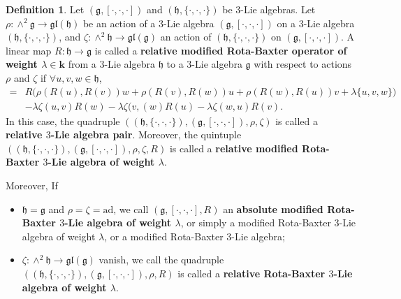 \documentclass[12pt]{amsart}
\theoremstyle{definition}
\newtheorem{defn}[theorem]{Definition}
\newcommand{\bk}{{\mathbf{k}}}
\begin{document}
\begin{defn}Let $\left(\mathfrak{g},[\cdot, \cdot, \cdot]\right)$ and $\left(\mathfrak{h},\{\cdot, \cdot, \cdot\}\right)$ be $3$-Lie algebras.
	Let $\rho: \wedge^2 \mathfrak{g} \rightarrow \mathfrak{g l}(\mathfrak{h})$  be an action of a $3$-Lie algebra $\left(\mathfrak{g},[\cdot, \cdot, \cdot]\right)$ on a $3$-Lie algebra $\left(\mathfrak{h},\{\cdot, \cdot, \cdot\}\right)$,  and $\zeta:\wedge^2\mathfrak{h}\rightarrow \mathfrak{g l}(\mathfrak{g})$ an action of   $\left(\mathfrak{h},\{\cdot, \cdot, \cdot\}\right)$ on  $\left(\mathfrak{g},[\cdot, \cdot, \cdot]\right)$. A linear map $R: \mathfrak{h} \rightarrow \mathfrak{g}$ is called a \textbf{relative modified Rota-Baxter  operator of weight $\lambda \in \bk$} from a $3$-Lie algebra $\mathfrak{h}$ to a $3$-Lie algebra $\mathfrak{g}$ with respect to   actions $\rho$ and $\zeta$ if $ \forall u, v, w \in \mathfrak{h}$,
	\begin{align*}
		[R(u), R(v), R(w)]=&R\Big(\rho(R(u), R(v)) w+\rho(R(v), R (w)) u+\rho(R(w), R(u)) v+\lambda \{u, v, w\}\Big)\\
		&-\lambda \zeta(u,v)R(w)-\lambda \zeta(v,(w)R(u)-\lambda \zeta(w,u)R(v).
	\end{align*}
In this case, the quadruple $\left(  \left(\mathfrak{h},\{\cdot, \cdot, \cdot\}\right),\left(\mathfrak{g},[\cdot, \cdot, \cdot]\right),\rho,\zeta \right) $ is called a \textbf{relative $3$-Lie algebra pair}.
Moreover, the quintuple $\left( \left(\mathfrak{h},\{\cdot, \cdot, \cdot\}\right),\left(\mathfrak{g},[\cdot, \cdot, \cdot]\right),\rho,\zeta,R\right) $ is called a \textbf{relative modified Rota-Baxter $3$-Lie algebra of weight $\lambda$}.
	
	Moreover, If
	\begin{itemize}
		\item  [(a)]  $\mathfrak{h}=\mathfrak{g}$ and $\rho=\zeta=\mathrm{ad}$, we call
		$(\mathfrak{g},[\cdot,\cdot,\cdot],R)$ an \textbf{absolute modified Rota-Baxter $3$-Lie algebra of weight $\lambda$},
		or simply a modified Rota-Baxter $3$-Lie algebra of weight $\lambda$,
		or a modified Rota-Baxter $3$-Lie algebra;
		\item [(b)] $\zeta:\wedge^2\mathfrak{h}\rightarrow \mathfrak{g l}(\mathfrak{g})$ vanish, we call the quadruple $\left( \left(\mathfrak{h},\{\cdot, \cdot, \cdot\}\right),\left(\mathfrak{g},[\cdot, \cdot, \cdot]\right),\rho,R\right) $ is called a \textbf{relative  Rota-Baxter $3$-Lie algebra of weight $\lambda$}.
	\end{itemize}
\end{defn}
\end{document}
